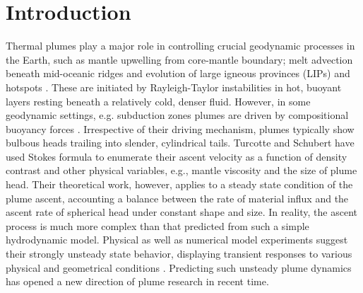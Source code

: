 \documentclass[12pt]{article}
\begin{document}
\section{Introduction}

Thermal plumes play a major role in controlling crucial geodynamic processes in the Earth, such as mantle upwelling from core-mantle boundary; melt advection beneath mid-oceanic ridges and evolution of large igneous provinces (LIPs) and hotspots \cite{morgan1971convection, white1989magmatism, campbell1990implications, sen2011deccan}. These are initiated by Rayleigh-Taylor instabilities in hot, buoyant layers resting beneath a relatively cold, denser fluid. However, in some geodynamic settings, e.g. subduction zones plumes are driven by compositional buoyancy forces \cite{gerya2003rayleigh, dutta2016role}. Irrespective of their driving mechanism, plumes typically show bulbous heads trailing into slender, cylindrical tails. Turcotte and Schubert \cite{turcotte2014geodynamics} have used Stokes formula to enumerate their ascent velocity as a function of density contrast and other physical variables, e.g., mantle viscosity and the size of plume head. Their theoretical work, however, applies to a steady state condition of the plume ascent, accounting a balance between the rate of material influx and the ascent rate of spherical head under constant shape and size. In reality, the ascent process is much more complex than that predicted from such a simple hydrodynamic model. Physical as well as numerical model experiments suggest their strongly unsteady state behavior, displaying transient responses to various physical and geometrical conditions \cite{griffiths1990stirring, davaille2005transient, lin2006dynamics1}. Predicting such unsteady plume dynamics has opened a new direction of plume research in recent time.
\end{document}
